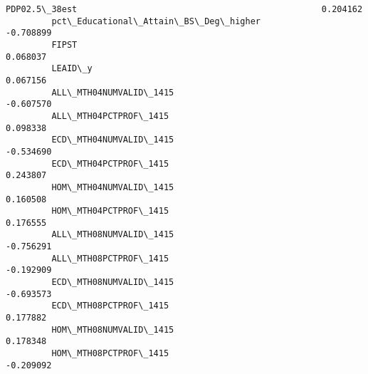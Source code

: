 \documentclass[11pt]{article}
\begin{document}
\begin{Verbatim}[commandchars=\\\{\}]
         PDP02.5\_38est                                                0.204162   
         pct\_Educational\_Attain\_BS\_Deg\_higher                        -0.708899   
         FIPST                                                        0.068037   
         LEAID\_y                                                      0.067156   
         ALL\_MTH04NUMVALID\_1415                                      -0.607570   
         ALL\_MTH04PCTPROF\_1415                                        0.098338   
         ECD\_MTH04NUMVALID\_1415                                      -0.534690   
         ECD\_MTH04PCTPROF\_1415                                        0.243807   
         HOM\_MTH04NUMVALID\_1415                                       0.160508   
         HOM\_MTH04PCTPROF\_1415                                        0.176555   
         ALL\_MTH08NUMVALID\_1415                                      -0.756291   
         ALL\_MTH08PCTPROF\_1415                                       -0.192909   
         ECD\_MTH08NUMVALID\_1415                                      -0.693573   
         ECD\_MTH08PCTPROF\_1415                                        0.177882   
         HOM\_MTH08NUMVALID\_1415                                       0.178348   
         HOM\_MTH08PCTPROF\_1415                                       -0.209092   
         

\end{Verbatim}
\end{document}
